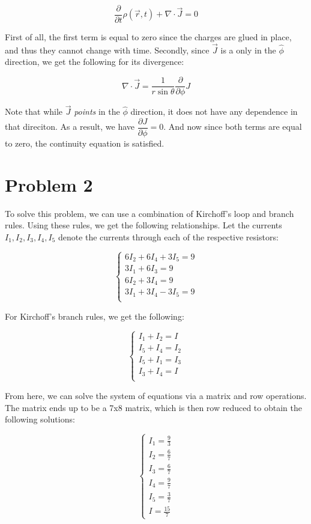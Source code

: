 \documentclass{article}
\theoremstyle{definition}
\numberwithin{equation}{section}
\numberwithin{definition}{section}
\begin{document}
\[ \frac{\partial }{\partial t} \rho(\vec{r}, t) + \nabla \cdot \vec{J} = 0\]

First of all, the first term is equal to zero since the charges are glued in place, and thus they cannot change with time. Secondly, since $\vec{J}$ is a only in the $\hat \phi$ direction, we get the following for its divergence:

\[ \nabla \cdot \vec{J} = \frac{1}{r\sin \theta} \frac{\partial}{\partial \phi} J\]

Note that while $\vec{J}$ \textit{points} in the $\hat \phi$ direction, it does not have any dependence in that direciton. As a result, we have $\dfrac{\partial J}{\partial \phi} = 0$. And now since both terms are equal to zero, the continuity equation is satisfied.


\section{Problem 2}

    To solve this problem, we can use a combination of Kirchoff's loop and branch rules. Using these rules, we get the following relationships. Let the currents $I_1, I_2, I_3, I_4, I_5$ denote the currents through each of the respective resistors:

\[\begin{cases}
    6I_2 + 6I_4 + 3I_5 = 9\\
    3I_1 + 6I_3 = 9\\
    6I_2 + 3I_4 = 9\\
    3I_1 + 3I_4 - 3I_5 = 9\\
\end{cases}\]

For Kirchoff's branch rules, we get the following: 

\[\begin{cases}
    I_1 + I_2 = I\\
    I_5 + I_4 = I_2\\
    I_5 + I_1 = I_3\\
    I_3 + I_4 = I\\
\end{cases}\]

From here, we can solve the system of equations via a matrix and row operations. The matrix ends up to be a 7x8 matrix, which is then row reduced to obtain the following solutions:

\[\begin{cases}
    I_1 = \frac{9}{3}\\
    I_2 = \frac{6}{7}\\
    I_3 = \frac{6}{7}\\
    I_4 = \frac{9}{7}\\
    I_5 = \frac{3}{7}\\
    I = \frac{15}{7}
\end{cases}\]
\end{document}
